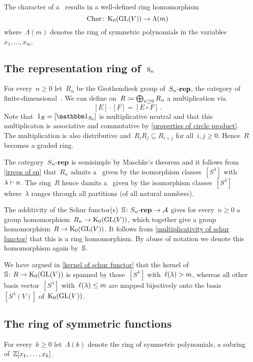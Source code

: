 \documentclass[a4paper,10pt]{scrartcl}
\begin{document}
The character of a~{} results in a well-defined ring homomorphism
\[
  \operatorname{Char}
  \colon
  \operatorname{K}_0(\operatorname{GL}(V))
  \to
  \Lambda(m)
\]
where~$\Lambda(m)$ denotes the ring of symmetric polynomials in the variables~$x_1, \dotsc, x_m$.


\subsection{The representation ring of~$\operatorname{S}_n$}

For every~$n \geq 0$ let~$R_n$ be the Grothendieck group of~$S_n\text{-}\mathbf{rep}$, the category of finite-dimensional~{}.
We can define on~$R \coloneqq \bigoplus_{n \geq 0} R_n$ a multiplication via
\[
  [E] \cdot [F]
  =
  [E \circ F] \,.
\]
Note that~$1_R = [\trivrep_{S_0}]$ is multiplicative neutral and that this multiplicaton is associative and commutative by \cref{properties of circle product}.
The multiplication is also distributive and~$R_i R_j \subseteq R_{i+j}$ for all~$i,j \geq 0$.
Hence~$R$ becomes a graded ring.

The category~$S_n\text{-}\mathbf{rep}$ is semisimple by Maschke’s theorem and it follows from \cref{irreps of sn} that~$R_n$ admits a~{\basis{$\Integer$}} given by the isomorphism classes~$[S^\lambda]$ with~$\lambda \vdash n$.
The ring~$R$ hence damits a~{\basis{$\Integer$}} given by the isomorphism classes~$[S^\lambda]$ where~$\lambda$ ranges through all partitions (of all natural numbers).

The additivity of the Schur functor(s)~$\mathbb{S} \colon S_n\text{-}\mathbf{rep} \to \mathcal{A}$ gives for every~$n \geq 0$ a group homomorphism~$R_n \to \operatorname{K}_0(\operatorname{GL}(V))$, which together give a group homomorphism~$R \to \operatorname{K}_0(\operatorname{GL}(V))$.
It follows from \cref{multiplicativity of schur functor} that this is a ring homomorphism.
By abuse of notation we denote this homomorphism again by~$\mathbb{S}$.

We have argued in \cref{kernel of schur functor} that the kernel of~$\mathbb{S} \colon R \to \operatorname{K}_0(\operatorname{GL}(V))$ is spanned by those~$[S^\lambda]$ with~$\operatorname{\ell}(\lambda) > m$, whereas all other basis vector~$[S^\lambda]$ with~$\operatorname{\ell}(\lambda) \leq m$ are mapped bijectively onto the basis~$[S^\lambda(V)]$ of~$\operatorname{K}_0(\operatorname{GL}(V))$.


\subsection{The ring of symmetric functions}

For every~$k \geq 0$ let~$\Lambda(k)$ denote the ring of symmetric polynomials, a subring of~$\mathbb{Z}[x_1, \dotsc, x_k]$.
\end{document}
